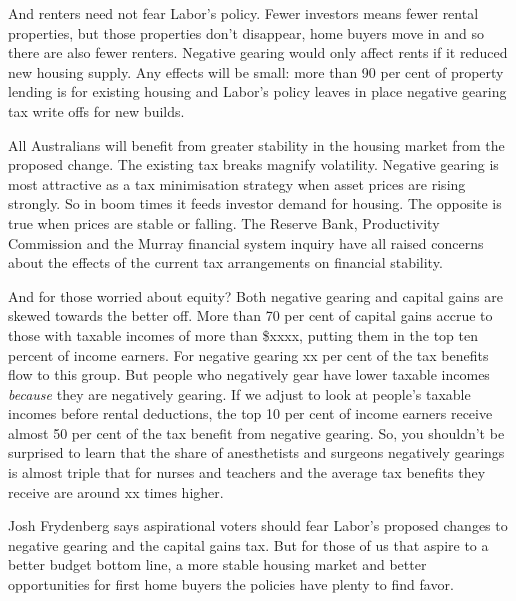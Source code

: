 \documentclass[]{article}
\begin{document}
And renters need not fear Labor's policy. Fewer investors means fewer
rental properties, but those properties don't disappear, home buyers
move in and so there are also fewer renters. Negative gearing would only
affect rents if it reduced new housing supply. Any effects will be
small: more than 90 per cent of property lending is for existing housing
and Labor's policy leaves in place negative gearing tax write offs for
new builds.

All Australians will benefit from greater stability in the housing
market from the proposed change. The existing tax breaks magnify
volatility. Negative gearing is most attractive as a tax minimisation
strategy when asset prices are rising strongly. So in boom times it
feeds investor demand for housing. The opposite is true when prices are
stable or falling. The Reserve Bank, Productivity Commission and the
Murray financial system inquiry have all raised concerns about the
effects of the current tax arrangements on financial stability.

And for those worried about equity? Both negative gearing and capital
gains are skewed towards the better off. More than 70 per cent of
capital gains accrue to those with taxable incomes of more than \$xxxx,
putting them in the top ten percent of income earners. For negative
gearing xx per cent of the tax benefits flow to this group. But people
who negatively gear have lower taxable incomes \emph{because} they are
negatively gearing. If we adjust to look at people's taxable incomes
before rental deductions, the top 10 per cent of income earners receive
almost 50 per cent of the tax benefit from negative gearing. So, you
shouldn't be surprised to learn that the share of anesthetists and
surgeons negatively gearings is almost triple that for nurses and
teachers and the average tax benefits they receive are around xx times
higher.

Josh Frydenberg says aspirational voters should fear Labor's proposed
changes to negative gearing and the capital gains tax. But for those of
us that aspire to a better budget bottom line, a more stable housing
market and better opportunities for first home buyers the policies have
plenty to find favor.
\end{document}
